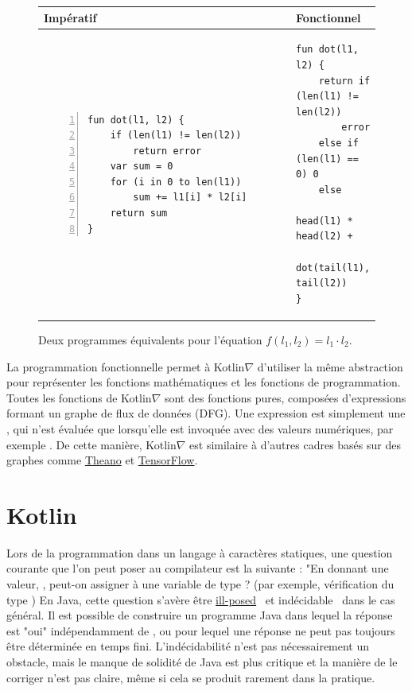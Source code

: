 \begin{figure}[t]
    \centering
    \begin{tabular}{|l|l|}
        \hline
        Impératif & Fonctionnel \\
        \hline
{\begin{lstlisting}[style=barelisting, linewidth=5.7cm, numbers=left]
fun dot(l1, l2) {
    if (len(l1) != len(l2))
        return error
    var sum = 0
    for (i in 0 to len(l1))
        sum += l1[i] * l2[i]
    return sum
}
\end{lstlisting}}
        &
{\begin{lstlisting}[style=barelisting, linewidth=6.5cm, numbers=none]
fun dot(l1, l2) {
    return if (len(l1) != len(l2))
        error
    else if (len(l1) == 0) 0
    else
        head(l1) * head(l2) +
        dot(tail(l1), tail(l2))
}
\end{lstlisting}}
        \\
        \hline
    \end{tabular}
    \caption{Deux programmes équivalents pour l'équation $f(l_1, l_2) = l_1 \cdot l_2$.}
    \label{fig:fp_vs_ip}
\end{figure}

La programmation fonctionnelle permet à Kotlin$\nabla$ d'utiliser la même abstraction pour représenter les fonctions mathématiques et les fonctions de programmation. Toutes les fonctions de Kotlin$\nabla$ sont des fonctions pures, composées d'expressions formant un graphe de flux de données (DFG). Une expression est simplement une , qui n'est évaluée que lorsqu'elle est invoquée avec des valeurs numériques, par exemple . De cette manière, Kotlin$\nabla$ est similaire à d'autres cadres basés sur des graphes comme \href{http://deeplearning.net/software/theano/extending/graphstructures.html}{Theano} et \href{https://www.tensorflow.org/guide/graphs}{TensorFlow}.

\section{Kotlin}\label{sec:kotlin}

Lors de la programmation dans un langage à caractères statiques, une question courante que l'on peut poser au compilateur est la suivante : "En donnant une valeur, , peut-on assigner  à une variable de type ? (par exemple, vérification du type ) En Java, cette question s'avère être \href{http://io.livecode.ch/learn/namin/unsound}{ill-posed}~\citep{amin2016java} et indécidable~\citep{grigore2017java} dans le cas général. Il est possible de construire un programme Java dans lequel la réponse est "oui" indépendamment de , ou pour lequel une réponse ne peut pas toujours être déterminée en temps fini. L'indécidabilité n'est pas nécessairement un obstacle, mais le manque de solidité de Java est plus critique et la manière de le corriger n'est pas claire, même si cela se produit rarement dans la pratique.

